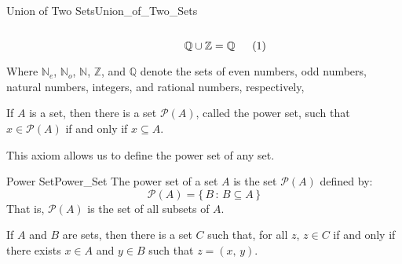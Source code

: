 \begin{lexample}{Union of Two Sets}{Union_of_Two_Sets}
\begin{subequations}
\begin{minipage}[b]{0.30\textwidth}
                \end{minipage}
                \hspace{0.03\textwidth}
                \begin{minipage}[b]{0.30\textwidth}
                    \centering
                    \begin{equation}
                        \mathbb{Q}\cup\mathbb{Z}=\mathbb{Q}
                    \end{equation}
                \end{minipage}
            \end{subequations}
            \par\vspace{2.5ex}
            Where $\mathbb{N}_{e}$, $\mathbb{N}_{o}$, $\mathbb{N}$,
            $\mathbb{Z}$, and $\mathbb{Q}$ denote the sets of even numbers,
            odd numbers, natural numbers, integers, and rational numbers,
            respectively,
        \end{lexample}
        \begin{axiom}
            \label{ax:Axiom_of_the_Power_Set}%
            If $A$ is a set, then there is a set $\mathcal{P}(A)$, called the
            power set, such that $x\in\mathcal{P}(A)$ if and only if
            $x\subseteq{A}$.
        \end{axiom}
        This axiom allows us to define the power set of any set.
        \begin{ldefinition}{Power Set}{Power_Set}
            The power set of a set $A$ is the set
            $\mathcal{P}(A)$ defined by:
            \begin{equation}
                \mathcal{P}(A)=\{\,B\,:\,B\subseteq{A}\,\}
            \end{equation}
            That is, $\mathcal{P}(A)$ is the set of all subsets of $A$.
        \end{ldefinition}
        \begin{theorem}
            \label{thm:Cartesian_Product_Exists}%
            If $A$ and $B$ are sets, then there is a set $C$ such that, for
            all $z$, $z\in{C}$ if and only if there exists $x\in{A}$ and
            $y\in{B}$ such that $z=(x,\,y)$.
        \end{theorem}
